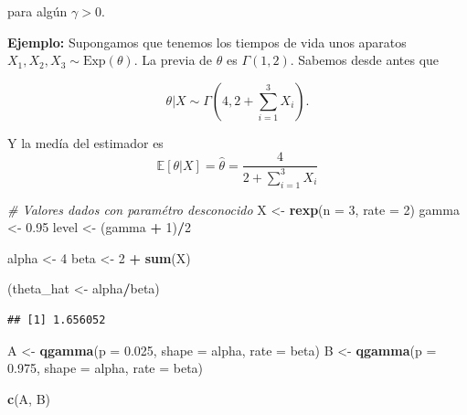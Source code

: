 \documentclass[
  12pt,
]{book}
\newenvironment{Shaded}{\begin{snugshade}}{\end{snugshade}}
\newcommand{\CommentTok}[1]{\textcolor[rgb]{0.56,0.35,0.01}{\textit{#1}}}
\newcommand{\DataTypeTok}[1]{\textcolor[rgb]{0.13,0.29,0.53}{#1}}
\newcommand{\DecValTok}[1]{\textcolor[rgb]{0.00,0.00,0.81}{#1}}
\newcommand{\FloatTok}[1]{\textcolor[rgb]{0.00,0.00,0.81}{#1}}
\newcommand{\KeywordTok}[1]{\textcolor[rgb]{0.13,0.29,0.53}{\textbf{#1}}}
\newcommand{\NormalTok}[1]{#1}
\newcommand{\OperatorTok}[1]{\textcolor[rgb]{0.81,0.36,0.00}{\textbf{#1}}}
\newcommand{\StringTok}[1]{\textcolor[rgb]{0.31,0.60,0.02}{#1}}
\begin{document}
para algún \(\gamma>0\).

\textbf{Ejemplo:} Supongamos que tenemos los tiempos de vida unos aparatos \(X_1, X_2, X_3 \sim \mathrm{Exp}(\theta)\). La previa de \(\theta\) es \(\Gamma(1,2)\). Sabemos desde antes que

\begin{equation*}
\theta \vert X \sim \Gamma(4, 2+ \sum_{i=1}^3 X_i). 
\end{equation*}

Y la medía del estimador es
\begin{equation*}
\mathbb E [\theta\vert X] = \hat \theta = \dfrac{4}{2+ \sum_{i=1}^3 X_i }
\end{equation*}

\begin{Shaded}
\begin{Highlighting}[]
\CommentTok{\# Valores dados con paramétro desconocido}
\NormalTok{X \textless{}{-}}\StringTok{ }\KeywordTok{rexp}\NormalTok{(}\DataTypeTok{n =} \DecValTok{3}\NormalTok{, }\DataTypeTok{rate =} \DecValTok{2}\NormalTok{)}
\NormalTok{gamma \textless{}{-}}\StringTok{ }\FloatTok{0.95}
\NormalTok{level \textless{}{-}}\StringTok{ }\NormalTok{(gamma }\OperatorTok{+}\StringTok{ }\DecValTok{1}\NormalTok{)}\OperatorTok{/}\DecValTok{2}

\NormalTok{alpha \textless{}{-}}\StringTok{ }\DecValTok{4}
\NormalTok{beta \textless{}{-}}\StringTok{ }\DecValTok{2} \OperatorTok{+}\StringTok{ }\KeywordTok{sum}\NormalTok{(X)}

\NormalTok{(theta\_hat \textless{}{-}}\StringTok{ }\NormalTok{alpha}\OperatorTok{/}\NormalTok{beta)}
\end{Highlighting}
\end{Shaded}

\begin{verbatim}
## [1] 1.656052
\end{verbatim}

\begin{Shaded}
\begin{Highlighting}[]
\NormalTok{A \textless{}{-}}\StringTok{ }\KeywordTok{qgamma}\NormalTok{(}\DataTypeTok{p =} \FloatTok{0.025}\NormalTok{, }\DataTypeTok{shape =}\NormalTok{ alpha, }\DataTypeTok{rate =}\NormalTok{ beta)}
\NormalTok{B \textless{}{-}}\StringTok{ }\KeywordTok{qgamma}\NormalTok{(}\DataTypeTok{p =} \FloatTok{0.975}\NormalTok{, }\DataTypeTok{shape =}\NormalTok{ alpha, }\DataTypeTok{rate =}\NormalTok{ beta)}

\KeywordTok{c}\NormalTok{(A, B)}
\end{Highlighting}
\end{Shaded}
\end{document}
